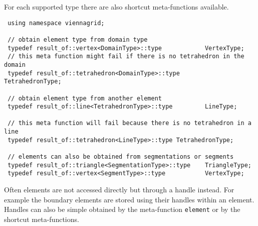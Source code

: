 For each supported type there are also shortcut meta-functions available.

\begin{lstlisting}
 using namespace viennagrid;
 
 // obtain element type from domain type
 typedef result_of::vertex<DomainType>::type            VertexType;
 // this meta function might fail if there is no tetrahedron in the domain
 typedef result_of::tetrahedron<DomainType>::type       TetrahedronType;
 
 // obtain element type from another element
 typedef result_of::line<TetrahedronType>::type         LineType;
 
 // this meta function will fail because there is no tetrahedron in a line
 typedef result_of::tetrahedron<LineType>::type TetrahedronType;
 
 // elements can also be obtained from segmentations or segments
 typedef result_of::triangle<SegmentationType>::type    TriangleType;
 typedef result_of::vertex<SegmentType>::type           VertexType;
\end{lstlisting}

\pagebreak

Often elements are not accessed directly but through a handle instead. For example the boundary elements are stored using their handles within an element. Handles can also be simple obtained by the meta-function \lstinline|element| or by the shortcut meta-functions.

